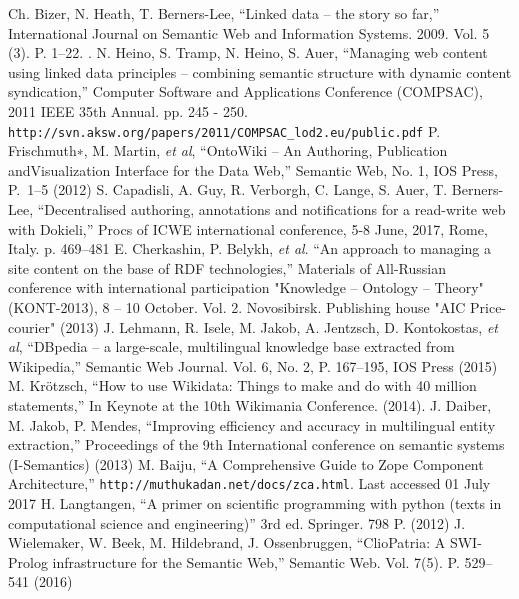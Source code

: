 \documentclass[conference,a4paper]{IEEEtran}
\providecommand\url[1]{\texttt{#1}}
\begin{document}
\begin{thebibliography}{99}
 Ch. Bizer, N. Heath, T. Berners-Lee, ``Linked data -- the story so
  far,'' International Journal on Semantic Web and Information Systems.
  2009. Vol. 5 (3). P. 1--22. .
 N. Heino, S. Tramp, N. Heino, S. Auer, ``Managing web content using linked data principles – combining semantic structure with dynamic content syndication,'' Computer Software and Applications Conference (COMPSAC), 2011 IEEE 35th Annual. pp. 245 - 250.  \url{http://svn.aksw.org/papers/2011/COMPSAC_lod2.eu/public.pdf}
 P. Frischmuth∗, M. Martin, \textit{et al}, ``OntoWiki – An Authoring, Publication andVisualization Interface for the Data Web,'' Semantic Web, No. 1, IOS Press, P.~1--5 (2012)
  S. Capadisli, A. Guy, R. Verborgh, C. Lange, S. Auer, T. Berners-Lee, ``Decentralised authoring, annotations and notifications for a read-write web with Dokieli,'' Procs of ICWE international conference, 5-8 June, 2017, Rome, Italy. p. 469--481 
  E. Cherkashin, P. Belykh, \textit{et al}. ``An approach to managing a site
  content on the base of RDF technologies,'' Materials of All-Russian
  conference with international participation "Knowledge -- Ontology --
  Theory" (KONT-2013), 8 -- 10 October. Vol. 2. Novosibirsk.
  Publishing house "AIC Price-courier" (2013)
  J. Lehmann, R. Isele, M. Jakob, A. Jentzsch, D. Kontokostas, \textit{et al},
  ``DBpedia -- a large-scale, multilingual knowledge base extracted from
  Wikipedia,'' Semantic Web Journal. Vol. 6, No. 2, P. 167--195,
  IOS Press (2015)
  M. Krötzsch, ``How to use Wikidata: Things to make and do with 40 million
  statements,'' In Keynote at the 10th Wikimania Conference. (2014).
  J. Daiber, M. Jakob, P. Mendes, ``Improving efficiency and accuracy in
  multilingual entity extraction,'' Proceedings of the 9th International
  conference on semantic systems (I-Semantics) (2013)
  M. Baiju, ``A Comprehensive Guide to Zope Component Architecture,''
\url{http://muthukadan.net/docs/zca.html}. Last accessed 01 July 2017
  H. Langtangen, ``A primer on scientific programming with python (texts in
  computational science and engineering)'' 3rd ed. Springer. 798 P. (2012)
  J. Wielemaker, W. Beek, M. Hildebrand, J. Ossenbruggen, ``ClioPatria: A
  SWI-Prolog infrastructure for the Semantic Web,'' Semantic Web.
  Vol. 7(5). P. 529--541 (2016) 

\end{thebibliography}
\end{document}
